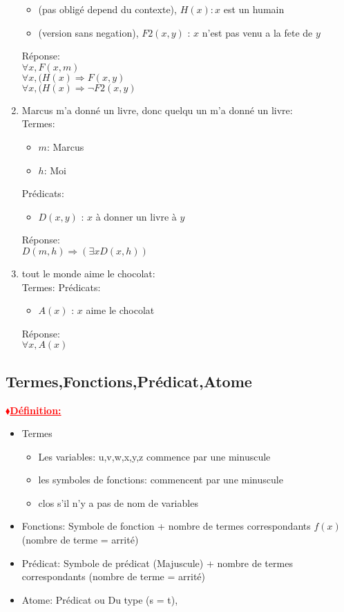 \documentclass[12pt]{report}
\newcommand{\rd}[1]{\textcolor{red}{#1}}
\newcommand{\blz}{$\blacklozenge$}
\newcommand{\defis}[1]
{
\begin{mybox}
\textbf{\rd{\underline{\blz Définition:} #1}}
\vspace{0.5cm}
\newline
}
\newcommand{\defie}
{
\end{mybox}
}
\begin{document}
\begin{enumerate}
\begin{itemize}
			\item (pas obligé depend du contexte), $H(x) : x$ est un humain
			\item (version sans negation), $F2(x,y)$ : $x$ n'est pas venu a la fete de $y$
		\end{itemize}
		Réponse:\\
		$\forall x, F(x,m)$\\
		$\forall x, (H(x) \Rightarrow F(x,y)$\\
		$\forall x, ( H(x) \Rightarrow \neg F2(x,y)$\\
\item Marcus m'a donné un livre, donc quelqu un m'a donné un livre:\\
		Termes:
		\begin{itemize}
			\item $m$: Marcus
			\item $h$: Moi
		\end{itemize}
		Prédicats:\\
		\begin{itemize}
			\item $D(x,y)$ : $x$  à  donner un livre à $y$ 
		\end{itemize}
		Réponse:\\
		$D(m,h) \Rightarrow (\exists x  D(x,h))$ 		
\item tout le monde aime le chocolat:\\
		Termes:
		Prédicats:\\
		\begin{itemize}
			\item $A(x)$ : $x$ aime le chocolat 
		\end{itemize}
		Réponse:\\
		$\forall x, A(x)$ 		
\end{enumerate}

\subsection{Termes,Fonctions,Prédicat,Atome}

\defis{}
\begin{itemize}
\item Termes
	\begin{itemize}
		\item Les variables: u,v,w,x,y,z commence par une minuscule
		\item les symboles de fonctions: commencent par une minuscule 
		\item clos s'il n'y a pas de nom de variables
	\end{itemize}
\item Fonctions: Symbole de fonction + nombre de termes correspondants $f(x)$ (nombre de terme = arrité)
\item Prédicat: Symbole de prédicat (Majuscule) + nombre de termes correspondants (nombre de terme = arrité) 
\item Atome: Prédicat ou Du type (s = t),
\end{itemize}
\defie
\end{document}
